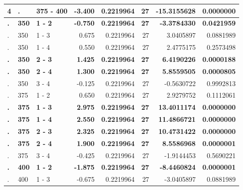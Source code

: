 \documentclass[12pt,]{article}
\begin{document}
\begin{table}[H]
\begin{tabular}{l|l|l|r|r|r|r|r}
\hline
\rowcolor[HTML]{EAFAF1}  \textbf{4} & \textbf{.} & \textbf{375 - 400} & \textbf{-3.400} & \textbf{0.2219964} & \textbf{27} & \textbf{-15.3155628} & \textbf{0.0000000}\\
\hline
\rowcolor[HTML]{EAFAF1}  \textbf{.} & \textbf{350} & \textbf{1 - 2} & \textbf{-0.750} & \textbf{0.2219964} & \textbf{27} & \textbf{-3.3784330} & \textbf{0.0421959}\\
\hline
. & 350 & 1 - 3 & 0.675 & 0.2219964 & 27 & 3.0405897 & 0.0881989\\
\hline
. & 350 & 1 - 4 & 0.550 & 0.2219964 & 27 & 2.4775175 & 0.2573498\\
\hline
\rowcolor[HTML]{EAFAF1}  \textbf{.} & \textbf{350} & \textbf{2 - 3} & \textbf{1.425} & \textbf{0.2219964} & \textbf{27} & \textbf{6.4190226} & \textbf{0.0000188}\\
\hline
\rowcolor[HTML]{EAFAF1}  \textbf{.} & \textbf{350} & \textbf{2 - 4} & \textbf{1.300} & \textbf{0.2219964} & \textbf{27} & \textbf{5.8559505} & \textbf{0.0000805}\\
\hline
. & 350 & 3 - 4 & -0.125 & 0.2219964 & 27 & -0.5630722 & 0.9992813\\
\hline
. & 375 & 1 - 2 & 0.650 & 0.2219964 & 27 & 2.9279752 & 0.1112061\\
\hline
\rowcolor[HTML]{EAFAF1}  \textbf{.} & \textbf{375} & \textbf{1 - 3} & \textbf{2.975} & \textbf{0.2219964} & \textbf{27} & \textbf{13.4011174} & \textbf{0.0000000}\\
\hline
\rowcolor[HTML]{EAFAF1}  \textbf{.} & \textbf{375} & \textbf{1 - 4} & \textbf{2.550} & \textbf{0.2219964} & \textbf{27} & \textbf{11.4866721} & \textbf{0.0000000}\\
\hline
\rowcolor[HTML]{EAFAF1}  \textbf{.} & \textbf{375} & \textbf{2 - 3} & \textbf{2.325} & \textbf{0.2219964} & \textbf{27} & \textbf{10.4731422} & \textbf{0.0000000}\\
\hline
\rowcolor[HTML]{EAFAF1}  \textbf{.} & \textbf{375} & \textbf{2 - 4} & \textbf{1.900} & \textbf{0.2219964} & \textbf{27} & \textbf{8.5586968} & \textbf{0.0000001}\\
\hline
. & 375 & 3 - 4 & -0.425 & 0.2219964 & 27 & -1.9144453 & 0.5690221\\
\hline
\rowcolor[HTML]{EAFAF1}  \textbf{.} & \textbf{400} & \textbf{1 - 2} & \textbf{-1.875} & \textbf{0.2219964} & \textbf{27} & \textbf{-8.4460824} & \textbf{0.0000001}\\
\hline
. & 400 & 1 - 3 & -0.675 & 0.2219964 & 27 & -3.0405897 & 0.0881989\\

\end{tabular}
\end{table}
\end{document}

